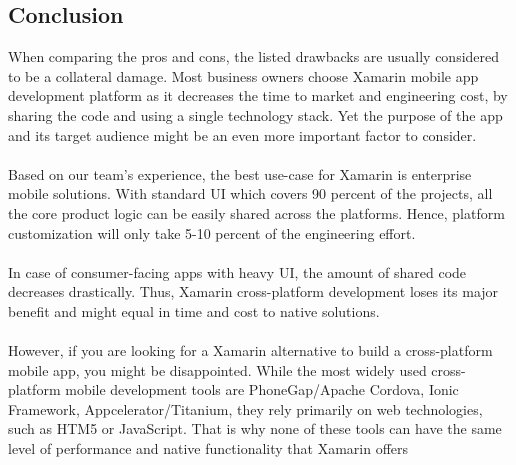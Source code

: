 \subsection{Conclusion}
When comparing the pros and cons, the listed drawbacks are usually considered to be a collateral damage.
Most business owners choose Xamarin mobile app development platform as it decreases the time to market and engineering cost, by sharing the code and using a single technology stack.
Yet the purpose of the app and its target audience might be an even more important factor to consider.

\paragraph{}
Based on our team’s experience, the best use-case for Xamarin is enterprise mobile solutions.
With standard UI which covers 90 percent of the projects, all the core product logic can be easily shared across the platforms.
 Hence, platform customization will only take 5-10 percent of the engineering effort.

\paragraph{}
In case of consumer-facing apps with heavy UI, the amount of shared code decreases drastically.
Thus, Xamarin cross-platform development loses its major benefit and might equal in time and cost to native solutions.

\paragraph{}
However, if you are looking for a Xamarin alternative to build a cross-platform mobile app, you might be disappointed.
While the most widely used cross-platform mobile development tools are PhoneGap/Apache Cordova, Ionic Framework, Appcelerator/Titanium,
they rely primarily on web technologies, such as HTM5 or JavaScript.
That is why none of these tools can have the same level of performance and native functionality that Xamarin offers
